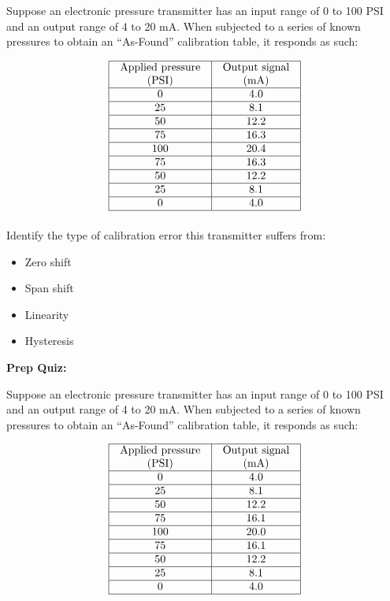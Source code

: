 \documentclass[12pt,a4paper]{article}
\begin{document}
Suppose an electronic pressure transmitter has an input range of 0 to 100 PSI and an output range of 4 to 20 mA.  When subjected to a series of known pressures to obtain an ``As-Found'' calibration table, it responds as such:


$$\vbox{\offinterlineskip
\halign{\strut
\vrule \quad\hfil # \ \hfil & 
\vrule \quad\hfil # \ \hfil \vrule \cr
\noalign{\hrule}
%
Applied pressure & Output signal \cr
%
(PSI) & (mA) \cr
%
\noalign{\hrule}
%
0 & 4.0 \cr
%
\noalign{\hrule}
%
25 & 8.1 \cr
%
\noalign{\hrule}
%
50 & 12.2 \cr
%
\noalign{\hrule}
%
75 & 16.3 \cr
%
\noalign{\hrule}
%
100 & 20.4 \cr
%
\noalign{\hrule}
%
75 & 16.3 \cr
%
\noalign{\hrule}
%
50 & 12.2 \cr
%
\noalign{\hrule}
%
25 & 8.1 \cr
%
\noalign{\hrule}
%
0 & 4.0 \cr
%
\noalign{\hrule}
} %
}$$ %

\vskip 10pt

Identify the type of calibration error this transmitter suffers from:

\begin{itemize}
\item{} Zero shift
\vskip 5pt 
\item{} Span shift
\vskip 5pt 
\item{} Linearity
\vskip 5pt 
\item{} Hysteresis
\end{itemize}



\vfil \eject

\noindent
{\bf Prep Quiz:}

Suppose an electronic pressure transmitter has an input range of 0 to 100 PSI and an output range of 4 to 20 mA.  When subjected to a series of known pressures to obtain an ``As-Found'' calibration table, it responds as such:


$$\vbox{\offinterlineskip
\halign{\strut
\vrule \quad\hfil # \ \hfil & 
\vrule \quad\hfil # \ \hfil \vrule \cr
\noalign{\hrule}
%
Applied pressure & Output signal \cr
%
(PSI) & (mA) \cr
%
\noalign{\hrule}
%
0 & 4.0 \cr
%
\noalign{\hrule}
%
25 & 8.1 \cr
%
\noalign{\hrule}
%
50 & 12.2 \cr
%
\noalign{\hrule}
%
75 & 16.1 \cr
%
\noalign{\hrule}
%
100 & 20.0 \cr
%
\noalign{\hrule}
%
75 & 16.1 \cr
%
\noalign{\hrule}
%
50 & 12.2 \cr
%
\noalign{\hrule}
%
25 & 8.1 \cr
%
\noalign{\hrule}
%
0 & 4.0 \cr
%
\noalign{\hrule}
} %
}$$ %
\end{document}
